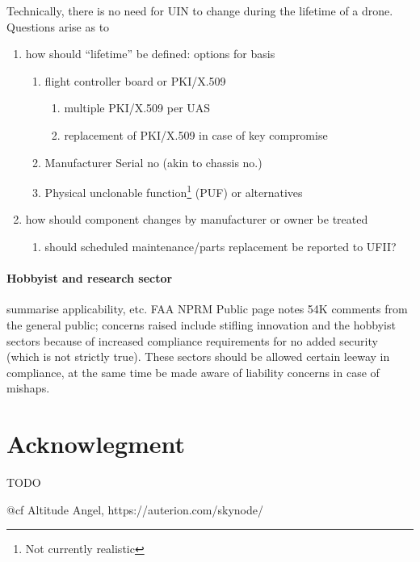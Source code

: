 \documentclass{ua_wgs_base}
\begin{document}
Technically, there is no need for UIN to change during the lifetime
of a drone. Questions arise as to
\begin{enumerate}
\item how should \textquotedblleft lifetime\textquotedblright{} be defined:
options for basis
\begin{enumerate}
\item flight controller board or PKI/X.509
\begin{enumerate}
\item multiple PKI/X.509 per UAS 
\item replacement of PKI/X.509 in case of key compromise
\end{enumerate}
\item Manufacturer Serial no (akin to chassis no.)
\item Physical unclonable function\footnote{Not currently realistic} (PUF)
or alternatives
\end{enumerate}
\item how should component changes by manufacturer or owner be treated
\begin{enumerate}
\item should scheduled maintenance/parts replacement be reported to UFII?
\end{enumerate}
\end{enumerate}

\paragraph{Hobbyist and research sector}

\begin{lyxgreyedout}
summarise applicability, etc. FAA NPRM Public page notes 54K comments
from the general public; concerns raised include stifling innovation
and the hobbyist sectors because of increased compliance requirements
for no added security (which is not strictly true). These sectors
should be allowed certain leeway in compliance, at the same time be
made aware of liability concerns in case of mishaps. %
\end{lyxgreyedout}


\section*{Acknowlegment}

\begin{lyxgreyedout}
TODO

@cf Altitude Angel, https://auterion.com/skynode/%
\end{lyxgreyedout}



\end{document}
